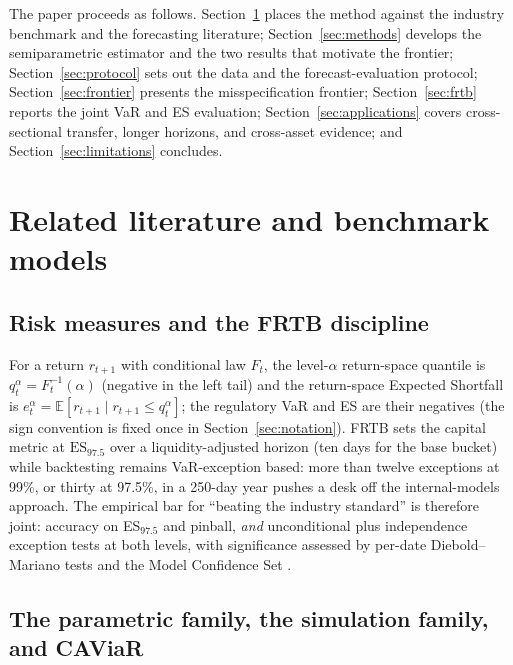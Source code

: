 \documentclass[11pt]{article}
\newcommand{\ES}{\mathrm{ES}}
\theoremstyle{remark}
\begin{document}
\medskip\noindent The paper proceeds as follows.
Section~\ref{sec:background} places the method against the industry
benchmark and the forecasting literature; Section~\ref{sec:methods}
develops the semiparametric estimator and the two results that motivate
the frontier; Section~\ref{sec:protocol} sets out the data and the
forecast-evaluation protocol; Section~\ref{sec:frontier} presents the
misspecification frontier; Section~\ref{sec:frtb} reports the joint VaR
and ES evaluation; Section~\ref{sec:applications} covers cross-sectional
transfer, longer horizons, and cross-asset evidence; and
Section~\ref{sec:limitations} concludes.

\section{Related literature and benchmark models}\label{sec:background}

\subsection{Risk measures and the FRTB discipline}

For a return $r_{t+1}$ with conditional law $F_t$, the level-$\alpha$
return-space quantile is $q_t^\alpha = F_t^{-1}(\alpha)$ (negative in
the left tail) and the return-space Expected Shortfall is
$e_t^\alpha = \mathbb{E}[r_{t+1} \mid r_{t+1} \le q_t^\alpha]$;
the regulatory VaR and ES are their negatives (the sign convention is
fixed once in Section~\ref{sec:notation}). FRTB
\citep{bcbs2019frtb} sets the
capital metric at $\ES_{97.5}$ over a liquidity-adjusted horizon (ten
days for the base bucket) while backtesting remains VaR-exception based:
more than twelve exceptions at 99\%, or thirty at 97.5\%, in a 250-day
year pushes a desk off the internal-models approach. The empirical bar
for ``beating the industry standard'' is
therefore joint: accuracy on ES$_{97.5}$ and pinball, \emph{and}
unconditional \citep{kupiec1995} plus independence
\citep{christoffersen1998} exception tests at both levels, with
significance assessed by per-date Diebold--Mariano tests
\citep{dieboldmariano1995} and the Model Confidence Set
\citep{hansen2011mcs}.

\subsection{The parametric family, the simulation family, and CAViaR}
\end{document}
